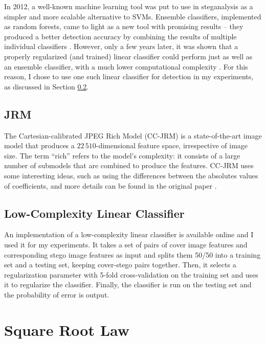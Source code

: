 \documentclass[11pt,a4paper,twoside,openright]{report}
\begin{document}
In 2012, a well-known machine learning tool was put to use in steganalysis as a simpler and more scalable alternative to SVMs. Ensemble classifiers, implemented as random forests, came to light as a new tool with promising results -- they produced a better detection accuracy by combining the results of multiple individual classifiers \cite{ensemble-classifier}. However, only a few years later, it was shown that a properly regularized (and trained) linear classifier could perform just as well as an ensemble classifier, with a much lower computational complexity \cite{classifier-paper}. For this reason, I chose to use one such linear classifier for detection in my experiments, as discussed in Section \ref{sec:classifier-background}.


\subsection{JRM} \label{sec:jrm}

The Cartesian-calibrated JPEG Rich Model (CC-JRM) is a state-of-the-art image model that produces a $22\,510$-dimensional feature space, irrespective of image size. The term ``rich'' refers to the model's complexity: it consists of a large number of submodels that are combined to produce the features. CC-JRM uses some interesting ideas, such as using the differences between the absolutes values of coefficients, and more details can be found in the original paper \cite{jrm-paper}.


\subsection{Low-Complexity Linear Classifier} \label{sec:classifier-background}

An implementation of a low-complexity linear classifier is available online \cite{binghamton-classifier} and I used it for my experiments. It takes a set of pairs of cover image features and corresponding stego image features as input and splits them 50/50 into a training set and a testing set, keeping cover-stego pairs together. Then, it selects a regularization parameter with 5-fold cross-validation on the training set and uses it to regularize the classifier. Finally, the classifier is run on the testing set and the probability of error is output.


\section{Square Root Law}
\end{document}

